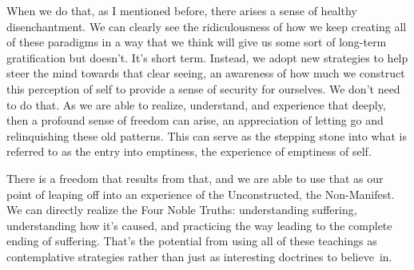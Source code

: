 When we do that, as I mentioned before, there arises a sense of healthy disenchantment. We can clearly see the ridiculousness of how we keep creating all of these paradigms in a way that we think will give us some sort of long-term gratification but doesn't. It's short term. Instead, we adopt new strategies to help steer the mind towards that clear seeing, an awareness of how much we construct this perception of self to provide a sense of security for ourselves. We don't need to do that. As we are able to realize, understand, and experience that deeply, then a profound sense of freedom can arise, an appreciation of letting go and relinquishing these old patterns. This can serve as the stepping stone into what is referred to as the entry into emptiness, the experience of emptiness of self.

\enlargethispage{1\baselineskip}
There is a freedom that results from that, and we are able to use that as our point of leaping off into an experience of the Unconstructed, the Non-Manifest. We can directly realize the Four Noble Truths: understanding suffering, understanding how it's caused, and practicing the way leading to the complete ending of suffering. That's the potential from using all of these teachings as contemplative strategies rather than just as interesting doctrines to \mbox{believe in.}
